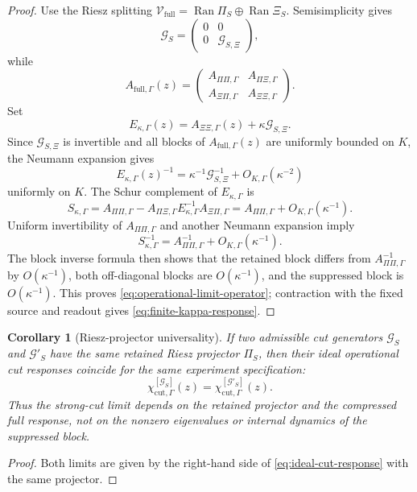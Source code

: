 \documentclass[11pt]{article}
\theoremstyle{definition}
\theoremstyle{remark}
\theoremstyle{plain}
\newtheorem{corollaryzerob}{Corollary}
\newcommand{\V}{\mathcal V}
\newcommand{\Ran}{\operatorname{Ran}}
\newcommand{\full}{\mathrm{full}}
\newcommand{\cut}{\mathrm{cut}}
\newcommand{\Gcut}{\mathcal G}
\begin{document}
\begin{proof}
Use the Riesz splitting $\V_{\full}=\Ran\Pi_S\oplus\Ran\Xi_S$.  Semisimplicity gives
\[
  \Gcut_S=
  \begin{pmatrix}0&0\\0&\Gcut_{S,\Xi}\end{pmatrix},
\]
while
\[
  A_{\full,\Gamma}(z)=
  \begin{pmatrix}
    A_{\Pi\Pi,\Gamma}&A_{\Pi\Xi,\Gamma}\\
    A_{\Xi\Pi,\Gamma}&A_{\Xi\Xi,\Gamma}
  \end{pmatrix}.
\]
Set
\[
  E_{\kappa,\Gamma}(z)
  =A_{\Xi\Xi,\Gamma}(z)+\kappa\Gcut_{S,\Xi}.
\]
Since $\Gcut_{S,\Xi}$ is invertible and all blocks of $A_{\full,\Gamma}(z)$ are uniformly bounded on $K$, the Neumann expansion gives
\begin{equation}\label{eq:suppressed-inverse}
  E_{\kappa,\Gamma}(z)^{-1}
  =\kappa^{-1}\Gcut_{S,\Xi}^{-1}+O_{K,\Gamma}(\kappa^{-2})
\end{equation}
uniformly on $K$.  The Schur complement of $E_{\kappa,\Gamma}$ is
\[
  S_{\kappa,\Gamma}
  =A_{\Pi\Pi,\Gamma}
   -A_{\Pi\Xi,\Gamma}E_{\kappa,\Gamma}^{-1}
    A_{\Xi\Pi,\Gamma}
  =A_{\Pi\Pi,\Gamma}+O_{K,\Gamma}(\kappa^{-1}).
\]
Uniform invertibility of $A_{\Pi\Pi,\Gamma}$ and another Neumann expansion imply
\[
  S_{\kappa,\Gamma}^{-1}
  =A_{\Pi\Pi,\Gamma}^{-1}+O_{K,\Gamma}(\kappa^{-1}).
\]
The block inverse formula then shows that the retained block differs from $A_{\Pi\Pi,\Gamma}^{-1}$ by $O(\kappa^{-1})$, both off-diagonal blocks are $O(\kappa^{-1})$, and the suppressed block is $O(\kappa^{-1})$.  This proves \eqref{eq:operational-limit-operator}; contraction with the fixed source and readout gives \eqref{eq:finite-kappa-response}.
\end{proof}

\begin{corollaryzerob}[Riesz-projector universality]\label{cor:projector-universality}
If two admissible cut generators $\Gcut_S$ and $\Gcut'_S$ have the same retained Riesz projector $\Pi_S$, then their ideal operational cut responses coincide for the same experiment specification:
\[
  \chi_{\cut,\Gamma}^{[\Gcut_S]}(z)
  =\chi_{\cut,\Gamma}^{[\Gcut'_S]}(z).
\]
Thus the strong-cut limit depends on the retained projector and the compressed full response, not on the nonzero eigenvalues or internal dynamics of the suppressed block.
\end{corollaryzerob}

\begin{proof}
Both limits are given by the right-hand side of \eqref{eq:ideal-cut-response} with the same projector.
\end{proof}
\end{document}
